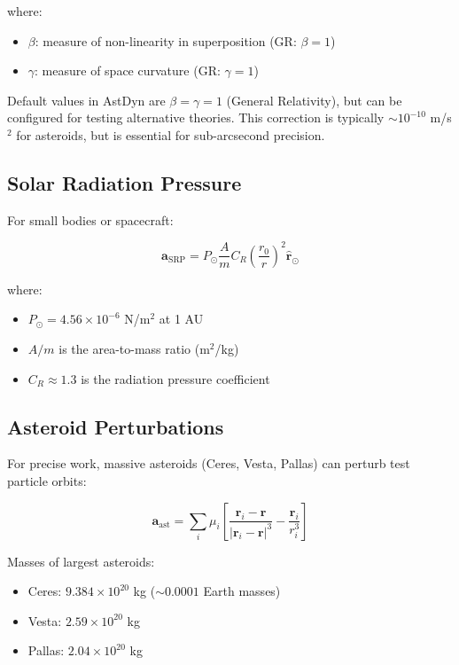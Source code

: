 where:
\begin{itemize}
    \item $\beta$: measure of non-linearity in superposition (GR: $\beta=1$)
    \item $\gamma$: measure of space curvature (GR: $\gamma=1$)
\end{itemize}

Default values in AstDyn are $\beta=\gamma=1$ (General Relativity), but can be configured for testing alternative theories. This correction is typically $\sim 10^{-10}$ m/s$^2$ for asteroids, but is essential for sub-arcsecond precision.

\subsection{Solar Radiation Pressure}

For small bodies or spacecraft:

\begin{equation}
    \mathbf{a}_{\text{SRP}} = P_\odot \frac{A}{m} C_R \left(\frac{r_0}{r}\right)^2 \hat{\mathbf{r}}_\odot
\end{equation}

where:
\begin{itemize}
    \item $P_\odot = 4.56 \times 10^{-6}$ N/m$^2$ at 1 AU
    \item $A/m$ is the area-to-mass ratio (m$^2$/kg)
    \item $C_R \approx 1.3$ is the radiation pressure coefficient
\end{itemize}

\subsection{Asteroid Perturbations}

For precise work, massive asteroids (Ceres, Vesta, Pallas) can perturb test particle orbits:

\begin{equation}
    \mathbf{a}_{\text{ast}} = \sum_{i} \mu_i \left[\frac{\mathbf{r}_i - \mathbf{r}}{|\mathbf{r}_i - \mathbf{r}|^3} - \frac{\mathbf{r}_i}{r_i^3}\right]
\end{equation}

Masses of largest asteroids:
\begin{itemize}
    \item Ceres: $9.384 \times 10^{20}$ kg ($\sim 0.0001$ Earth masses)
    \item Vesta: $2.59 \times 10^{20}$ kg
    \item Pallas: $2.04 \times 10^{20}$ kg
\end{itemize}

